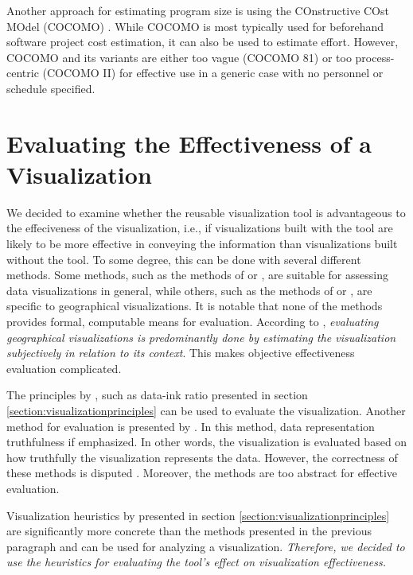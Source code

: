 Another approach for estimating program size is using the COnstructive COst MOdel (COCOMO) \citep{boehm_software_1981}. While COCOMO is most typically used for beforehand software project cost estimation, it can also be used to estimate effort. However, COCOMO and its variants are either too vague (COCOMO 81) or too process-centric (COCOMO II) for effective use in a generic case with no personnel or schedule specified. 

\section{Evaluating the Effectiveness of a Visualization}

We decided to examine whether the reusable visualization tool is advantageous to the effeciveness of the visualization, i.e., if visualizations built with the tool are likely to be more effective in conveying the information than visualizations built without the tool. To some degree, this can be done with several different methods. Some methods, such as the methods of \citet{tufte_visual_1986} or \citet{zuk_heuristics_2006}, are suitable for assessing data visualizations in general, while others, such as the methods of \citet{kraak_cartographic_1998} or \citet{schlichtmann_visualization_2002}, are specific to geographical visualizations. It is notable that none of the methods provides formal, computable means for evaluation. According to \citet{kraak_cartographic_1998}, \emph{evaluating geographical visualizations is predominantly done by estimating the visualization subjectively in relation to its context}. This makes objective effectiveness evaluation complicated.

The principles by \citet{tufte_visual_1986}, such as data-ink ratio presented in section \ref{section:visualizationprinciples} can be used to evaluate the visualization. Another method for evaluation is presented by \citet{azzam_j-b_2013}. In this method, data representation truthfulness if emphasized. In other words, the visualization is evaluated based on how truthfully the visualization represents the data. However, the correctness of these methods is disputed \citep{kosslyn_graphics_1985,inbar_minimalism_2007}. Moreover, the methods are too abstract for effective evaluation.

Visualization heuristics by \citet{zuk_heuristics_2006} presented in section \ref{section:visualizationprinciples} are significantly more concrete than the methods presented in the previous paragraph and can be used for analyzing a visualization. \emph{Therefore, we decided to use the heuristics for evaluating the tool's effect on visualization effectiveness.}

